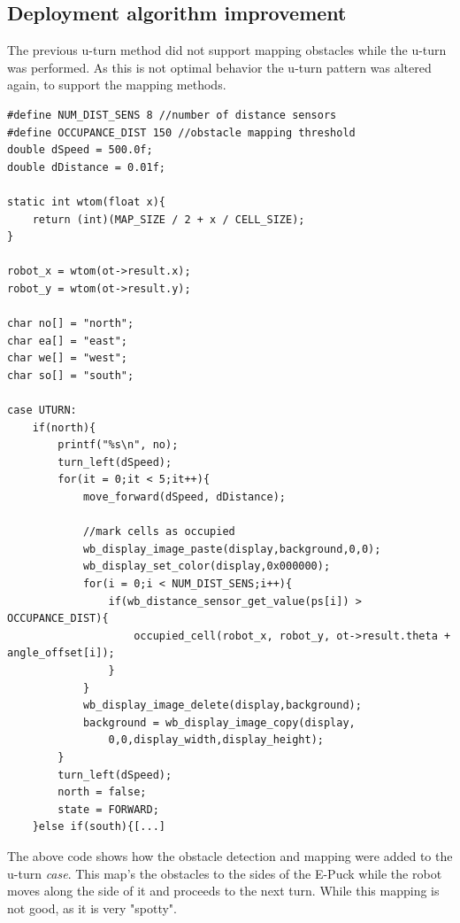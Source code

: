 \subsection{Deployment algorithm improvement}
\label{deployment_improvement}
The previous u-turn method did not support mapping obstacles while the u-turn was performed. As this is not optimal behavior the u-turn pattern was altered again, to support the mapping methods.

\begin{lstlisting}[caption={U-turn improved with obstacle detection and mapping}, label={uturn_code}]
#define NUM_DIST_SENS 8 //number of distance sensors
#define OCCUPANCE_DIST 150 //obstacle mapping threshold
double dSpeed = 500.0f;
double dDistance = 0.01f;

static int wtom(float x){
    return (int)(MAP_SIZE / 2 + x / CELL_SIZE);
}

robot_x = wtom(ot->result.x);
robot_y = wtom(ot->result.y);

char no[] = "north";
char ea[] = "east";
char we[] = "west";
char so[] = "south";

case UTURN:
    if(north){
        printf("%s\n", no);
        turn_left(dSpeed);
        for(it = 0;it < 5;it++){
            move_forward(dSpeed, dDistance);
            
            //mark cells as occupied
            wb_display_image_paste(display,background,0,0);
            wb_display_set_color(display,0x000000);
            for(i = 0;i < NUM_DIST_SENS;i++){
                if(wb_distance_sensor_get_value(ps[i]) > OCCUPANCE_DIST){
                    occupied_cell(robot_x, robot_y, ot->result.theta + angle_offset[i]);
                }
            }
            wb_display_image_delete(display,background);
            background = wb_display_image_copy(display,
                0,0,display_width,display_height);
        }
        turn_left(dSpeed);
        north = false;
        state = FORWARD;
    }else if(south){[...]
\end{lstlisting}

The above code shows how the obstacle detection and mapping were added to the u-turn \textit{case}.
This map's the obstacles to the sides of the E-Puck while the robot moves along the side of it and proceeds to the next turn. While this mapping is not good, as it is very "spotty".

